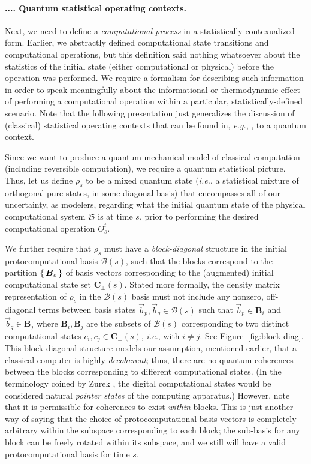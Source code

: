 \documentclass[preprints,article,accept,moreauthors,pdftex]{Definitions/mdpi}
\newcommand{\mypara}[1]{\paragraph{\arabic{section}.\arabic{subsection}.\arabic{subsubsection}.\arabic{paragraph}. #1}}
\begin{document}
\begin{paracol}{2}
\mypara{Quantum statistical operating contexts.}\label{par:qsoc}

Next, we need to define a \textit{computational process} in a statistically-contexualized form. Earlier, we abstractly defined computational state transitions and computational operations, but this definition said nothing whatsoever about the statistics of the initial state (either computational or physical) before the operation was performed. We require a formalism for describing such information in order to speak meaningfully about the informational or thermodynamic effect of performing a computational operation within a particular, statistically-defined scenario. 
Note that the following presentation just generalizes the discussion of (classical)  statistical operating contexts that can be found in, \emph{e.g.}, \cite{Fra18}, to a quantum context.

Since we want to produce a quantum-mechanical model of classical computation (including reversible computation), we require a quantum statistical picture. Thus, let us define $\rho_s$ to be a mixed quantum state (\emph{i.e.}, a statistical mixture of orthogonal pure states, in some diagonal basis) that encompasses all of our uncertainty, as modelers, regarding what the initial quantum state of the physical computational system $\mathfrak{S}$ is at time $s$, prior to performing the desired computational operation $O_s^t$.

We further require that $\rho_s$ must have a \emph{block-diagonal} structure in the initial protocomputational basis $\boldsymbol{\mathcal{B}}(s)$, such that the blocks correspond to the partition $\set{\boldsymbol{B}_c}$ of basis vectors corresponding to the (augmented) initial computational state set $\boldsymbol{C}_\bot(s)$. Stated more formally, the density matrix representation of $\rho_s$ in the $\boldsymbol{\mathcal{B}}(s)$ basis must not include any nonzero, off-diagonal terms between basis states $\vec{b}_p,\vec{b}_q \in \boldsymbol{\mathcal{B}}(s)$ such that $\vec{b}_p \in \boldsymbol{B}_i$ and $\vec{b}_q \in \boldsymbol{B}_j$ where $\boldsymbol{B}_i,\boldsymbol{B}_j$ are the subsets of $\boldsymbol{\mathcal{B}}(s)$ corresponding to two distinct computational states $c_i,c_j \in \boldsymbol{C}_\bot(s)$, \emph{i.e.}, with $i\neq j$. See Figure~\ref{fig:block-diag}.
This block-diagonal structure models our assumption, mentioned earlier, that a classical computer is highly \emph{decoherent}; thus, there are no quantum coherences between the blocks corresponding to different computational states. (In the terminology coined by Zurek \cite{Zur81}, the digital computational states would be considered natural \textit{pointer states} of the computing apparatus.)
However, note that it is permissible for coherences to exist \textit{within} blocks. This is just another way of saying that the choice of protocomputational basis vectors is completely arbitrary within the subspace corresponding to each block; the sub-basis for any block can be freely rotated within its subspace, and we still will have a valid protocomputational basis for time $s$.

\end{paracol}
\end{document}
